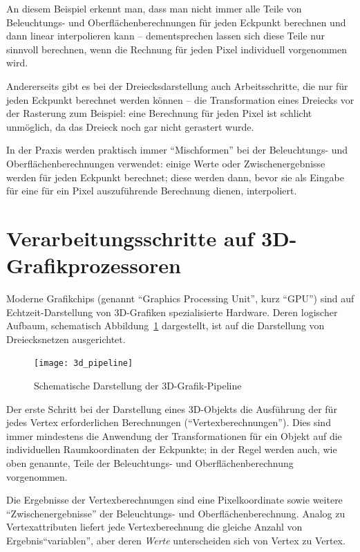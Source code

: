 \documentclass[twoside,a4paper,fleqn,12pt]{book}
\begin{document}
An diesem Beispiel erkennt man, dass man nicht immer alle Teile von Beleuchtungs- und Oberflächenberechnungen für jeden Eckpunkt berechnen und
dann linear interpolieren kann -- dementsprechen lassen sich diese Teile nur sinnvoll berechnen, wenn die Rechnung für jeden Pixel individuell vorgenommen wird.

Andererseits gibt es bei der Dreiecksdarstellung auch Arbeitsschritte, die nur für jeden Eckpunkt berechnet werden können -- die Transformation eines
Dreiecks vor der Rasterung zum Beispiel: eine Berechnung für jeden Pixel ist schlicht unmöglich, da das Dreieck noch gar nicht gerastert wurde.

In der Praxis werden praktisch immer "`Mischformen"' bei der Beleuchtungs- und Oberflächenberechnungen verwendet: einige Werte oder
Zwischenergebnisse werden für jeden Eckpunkt berechnet; diese werden dann, bevor sie als Eingabe für eine für ein Pixel auszuführende
Berechnung dienen, interpoliert.

\section{Verarbeitungsschritte auf 3D-Grafikprozessoren}
\label{hw_steps}

Moderne Grafikchips (genannt ``Graphics Processing Unit'', kurz ``GPU'') sind auf Echtzeit-Darstellung von 3D-Grafiken spezialisierte Hardware.
Deren logischer Aufbaum, schematisch Abbildung~\ref{fig:3d_pipeline} dargestellt, ist auf die Darstellung von Dreiecksnetzen ausgerichtet. 

\begin{figure}[h]
  \centering
  \texttt{[image: 3d\_pipeline]}
  \caption{Schematische Darstellung der 3D-Grafik-Pipeline}
  \label{fig:3d_pipeline}
\end{figure}

Der erste Schritt bei der Darstellung
eines 3D-Objekts die Ausführung der für jedes Vertex erforderlichen Berechnungen ("`\gls{Vertexberechnungen}"').
Dies sind immer mindestens die Anwendung der Transformationen für ein Objekt auf die individuellen Raumkoordinaten der Eckpunkte;
in der Regel werden auch, wie oben genannte, Teile der Beleuchtungs- und Oberflächenberechnung vorgenommen.

Die Ergebnisse der Vertexberechnungen sind eine Pixelkoordinate sowie weitere "`Zwischenergebnisse"' der Beleuchtungs- und Oberflächenberechnung.
Analog zu Vertexattributen liefert jede Vertexberechnung die gleiche Anzahl von Ergebnis"`variablen"', aber deren \emph{Werte} unterscheiden sich
von Vertex zu Vertex.
\end{document}
